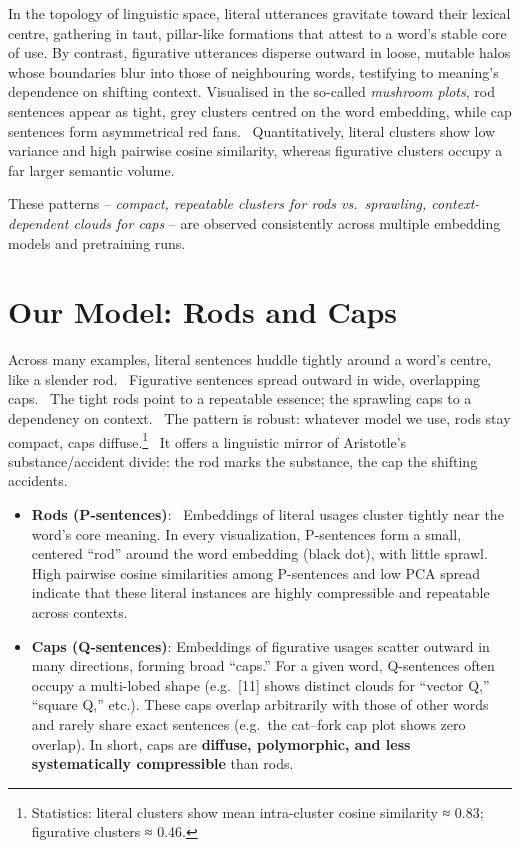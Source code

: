 \documentclass[12pt]{article}
\begin{document}
In the topology of linguistic space, literal utterances gravitate toward their lexical centre, gathering in taut, pillar-like formations that attest to a word's stable core of use. By contrast, figurative utterances disperse outward in loose, mutable halos whose boundaries blur into those of neighbouring words, testifying to meaning's dependence on shifting context. Visualised in the so-called \emph{mushroom plots}, rod sentences appear as tight, grey clusters centred on the word embedding, while cap sentences form asymmetrical red fans.~ Quantitatively, literal clusters show low variance and high pairwise cosine similarity, whereas figurative clusters occupy a far larger semantic volume.

These patterns -- \emph{compact, repeatable clusters for rods vs.~sprawling, context-dependent clouds for caps} -- are observed consistently across multiple embedding models and pretraining runs.

\section{Our Model: Rods and Caps}\label{our-model-rods-and-caps}

Across many examples, literal sentences huddle tightly around a word's centre, like a slender rod.~ Figurative sentences spread outward in wide, overlapping caps.~ The tight rods point to a repeatable essence; the sprawling caps to a dependency on context.~ The pattern is robust: whatever model we use, rods stay compact, caps diffuse.\footnote{Statistics: literal clusters show mean intra-cluster cosine similarity ≈ 0.83; figurative clusters ≈ 0.46.}~ It offers a linguistic mirror of Aristotle's substance/accident divide: the rod marks the substance, the cap the shifting accidents.

\begin{itemize}
\item
  \textbf{Rods (P‑sentences)}:~ Embeddings of literal usages cluster tightly near the word's core meaning. In every visualization, P‑sentences form a small, centered ``rod'' around the word embedding (black dot), with little sprawl. High pairwise cosine similarities among P-sentences and low PCA spread indicate that these literal instances are highly compressible and repeatable across contexts.
\item
  \textbf{Caps (Q‑sentences)}: Embeddings of figurative usages scatter outward in many directions, forming broad ``caps.'' For a given word, Q-sentences often occupy a multi-lobed shape (e.g.~{[}11{]} shows distinct clouds for ``vector Q,'' ``square Q,'' etc.). These caps overlap arbitrarily with those of other words and rarely share exact sentences (e.g.~the cat--fork cap plot shows zero overlap). In short, caps are \textbf{diffuse, polymorphic, and less systematically compressible} than rods.
\end{itemize}
\end{document}
